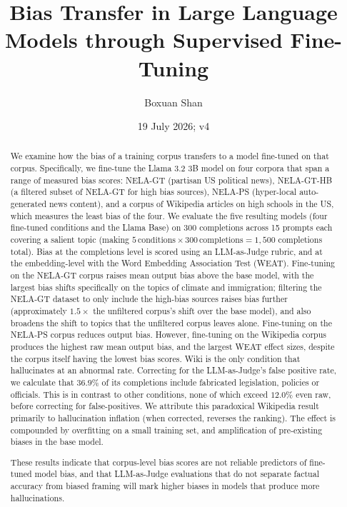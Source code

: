 \documentclass[12pt]{article}
\title{Bias Transfer in Large Language Models through Supervised Fine-Tuning}
\author{Boxuan Shan}
\date{19 July 2026; v4}
\begin{document}
\maketitle

\begin{abstract}

  We examine how the bias of a training corpus transfers to a model fine-tuned on that corpus. 
  Specifically, we fine-tune the Llama 3.2 3B model on four corpora that span a range of measured bias scores: NELA-GT (partisan US political news), NELA-GT-HB (a filtered subset of NELA-GT for high bias sources), NELA-PS (hyper-local auto-generated news content), and a corpus of Wikipedia articles on high schools in the US, which measures the least bias of the four.  
  We evaluate the five resulting models (four fine-tuned conditions and the Llama Base) on 300 completions across 15 prompts each covering a salient topic (making $5\,\mathrm{conditions}\times300\,\mathrm{completions}=1,500$ completions total). 
  Bias at the completions level is scored using an LLM-as-Judge rubric, and at the embedding-level with the Word Embedding Association Test (WEAT). 
  Fine-tuning on the NELA-GT corpus raises mean output bias above the base model, with the largest bias shifts specifically on the topics of climate and immigration; filtering the NELA-GT dataset to only include the high-bias sources raises bias further (approximately $1.5\times$ the unfiltered corpus's shift over the base model), and also broadens the shift to topics that the unfiltered corpus leaves alone.
  Fine-tuning on the NELA-PS corpus reduces output bias. 
  However, fine-tuning on the Wikipedia corpus produces the highest raw mean output bias, and the largest WEAT effect sizes, despite the corpus itself having the lowest bias scores.
  Wiki is the only condition that hallucinates at an abnormal rate.
  Correcting for the LLM-as-Judge's false positive rate, we calculate that $36.9\%$ of its completions include fabricated legislation, policies or officials. 
  This is in contrast to other conditions, none of which exceed $12.0\%$ even raw, before correcting for false-positives.
  We attribute this paradoxical Wikipedia result primarily to hallucination inflation (when corrected, reverses the ranking).
  The effect is compounded by overfitting on a small training set, and amplification of pre-existing biases in the base model.  

  These results indicate that corpus-level bias scores are not reliable predictors of fine-tuned model bias, and that LLM-as-Judge evaluations that do not separate factual accuracy from biased framing will mark higher biases in models that produce more hallucinations. 
\end{abstract}
\end{document}
